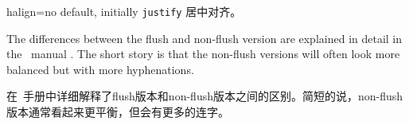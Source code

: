 \begin{docTcbKey}[][doc new=2015-05-07]{halign}{=}{no default, initially \texttt{justify}}
{居中对齐。}%



The differences between the flush and non-flush version are explained in
detail in the \tikzname\ manual \cite{tantau:tikz_and_pgf}. The short story is that
the non-flush versions will often look more balanced but with more
hyphenations.


在\tikzname\ 手册\cite{tantau:tikz_and_pgf}中详细解释了flush版本和non-flush版本之间的区别。简短的说，non-flush版本通常看起来更平衡，但会有更多的连字。


\end{docTcbKey}
